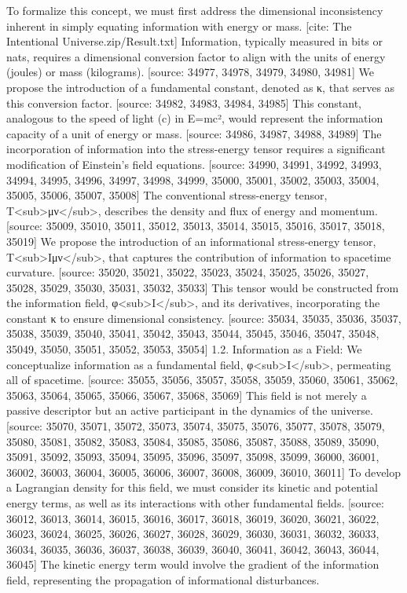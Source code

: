 \documentclass[12pt]{article}
\begin{document}
To formalize this concept, we must first address the dimensional inconsistency inherent in simply equating information with energy or mass.
[cite: The Intentional Universe.zip/Result.txt] Information, typically measured in bits or nats, requires a dimensional conversion factor to align with the units of energy (joules) or mass (kilograms).
[source: 34977, 34978, 34979, 34980, 34981] We propose the introduction of a fundamental constant, denoted as κ, that serves as this conversion factor.
[source: 34982, 34983, 34984, 34985] This constant, analogous to the speed of light (c) in E=mc², would represent the information capacity of a unit of energy or mass.
[source: 34986, 34987, 34988, 34989] The incorporation of information into the stress-energy tensor requires a significant modification of Einstein's field equations.
[source: 34990, 34991, 34992, 34993, 34994, 34995, 34996, 34997, 34998, 34999, 35000, 35001, 35002, 35003, 35004, 35005, 35006, 35007, 35008] The conventional stress-energy tensor, T<sub>μν</sub>, describes the density and flux of energy and momentum.
[source: 35009, 35010, 35011, 35012, 35013, 35014, 35015, 35016, 35017, 35018, 35019] We propose the introduction of an informational stress-energy tensor, T<sub>Iμν</sub>, that captures the contribution of information to spacetime curvature.
[source: 35020, 35021, 35022, 35023, 35024, 35025, 35026, 35027, 35028, 35029, 35030, 35031, 35032, 35033] This tensor would be constructed from the information field, φ<sub>I</sub>, and its derivatives, incorporating the constant κ to ensure dimensional consistency.
[source: 35034, 35035, 35036, 35037, 35038, 35039, 35040, 35041, 35042, 35043, 35044, 35045, 35046, 35047, 35048, 35049, 35050, 35051, 35052, 35053, 35054] 1.2. Information as a Field:
We conceptualize information as a fundamental field, φ<sub>I</sub>, permeating all of spacetime.
[source: 35055, 35056, 35057, 35058, 35059, 35060, 35061, 35062, 35063, 35064, 35065, 35066, 35067, 35068, 35069] This field is not merely a passive descriptor but an active participant in the dynamics of the universe.
[source: 35070, 35071, 35072, 35073, 35074, 35075, 35076, 35077, 35078, 35079, 35080, 35081, 35082, 35083, 35084, 35085, 35086, 35087, 35088, 35089, 35090, 35091, 35092, 35093, 35094, 35095, 35096, 35097, 35098, 35099, 36000, 36001, 36002, 36003, 36004, 36005, 36006, 36007, 36008, 36009, 36010, 36011] To develop a Lagrangian density for this field, we must consider its kinetic and potential energy terms, as well as its interactions with other fundamental fields.
[source: 36012, 36013, 36014, 36015, 36016, 36017, 36018, 36019, 36020, 36021, 36022, 36023, 36024, 36025, 36026, 36027, 36028, 36029, 36030, 36031, 36032, 36033, 36034, 36035, 36036, 36037, 36038, 36039, 36040, 36041, 36042, 36043, 36044, 36045] The kinetic energy term would involve the gradient of the information field, representing the propagation of informational disturbances.
\end{document}
